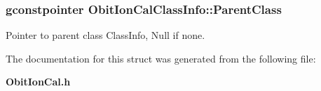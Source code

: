 \subsubsection{\setlength{\rightskip}{0pt plus 5cm}gconstpointer {\bf Obit\-Ion\-Cal\-Class\-Info::Parent\-Class}}\label{structObitIonCalClassInfo_o3}


Pointer to parent class Class\-Info, Null if none. 



The documentation for this struct was generated from the following file:\begin{CompactItemize}
\item 
{\bf Obit\-Ion\-Cal.h}\end{CompactItemize}
